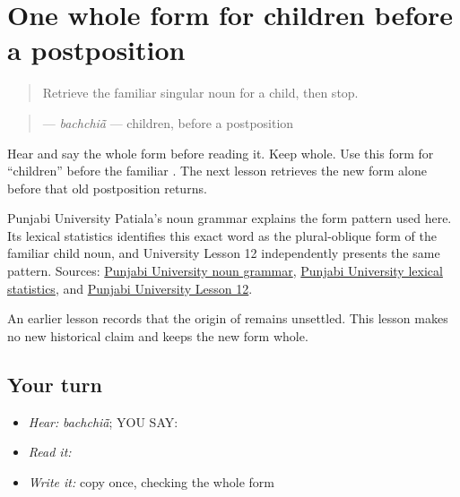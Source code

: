 \section[\texorpdfstring{\pa{ਬੱਚਿਆਂ} (bachchiaan)}{ਬੱਚਿਆਂ (bachchiaan)}]{One whole form for children before a postposition}

\label{lesson:PA-C204-bachchian}



\begin{quote}
Retrieve the familiar singular noun for a child, then stop.
\end{quote}

\begin{grammarlens}[title={Grammar Lens: direct owner}]
\begin{quote}
\textbf{} — \emph{bachchiā̃} — children, before a postposition
\end{quote}

Hear and say the whole form before reading it. Keep \textbf{} whole. Use this form for “children” before the familiar \textbf{}. The next lesson retrieves the new form alone before that old postposition returns.
\end{grammarlens}

\begin{cousinweb}
Punjabi University Patiala's noun grammar explains the form pattern used here. Its lexical statistics identifies this exact word as the plural-oblique form of the familiar child noun, and University Lesson 12 independently presents the same pattern. Sources: \href{https://www.learnpunjabi.org/noun.html}{Punjabi University noun grammar}, \href{https://www.learnpunjabi.org/statistics.html}{Punjabi University lexical statistics}, and \href{https://pt.learnpunjabi.org/lesson12.aspx?l=12}{Punjabi University Lesson 12}.

An earlier lesson records that the origin of \textbf{} remains unsettled. This lesson makes no new historical claim and keeps the new form whole.
\end{cousinweb}

\subsection*{Your turn}
\begin{itemize}
\raggedright
  \item \emph{Hear:} \emph{bachchiā̃}; YOU SAY: \textbf{}
  \item \emph{Read it:} \textbf{}
  \item \emph{Write it:} copy \textbf{} once, checking the whole form
\end{itemize}

